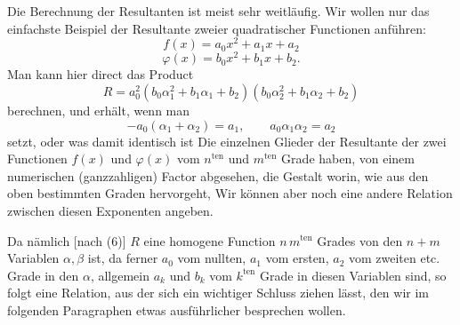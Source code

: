 
Die Berechnung der Resultanten ist meist sehr weitläufig. Wir wollen nur das einfachste Beispiel der Resultante zweier quadratischer Functionen anführen:
\[
f(x) = a_0 x^2 + a_1 x + a_2
\]
\[
\varphi(x) = b_0 x^2 + b_1 x + b_2.
\]
Man kann hier direct das Product
\[
R = a_0^2 (b_0 \alpha_1^2 + b_1 \alpha_1 + b_2) (b_0 \alpha_2^2 + b_1 \alpha_2 + b_2)
\]
berechnen, und erhält, wenn man
\[
- a_0 (\alpha_1 + \alpha_2) = a_1, \qquad a_0 \alpha_1 \alpha_2 = a_2
\]
setzt,
oder was damit identisch ist
Die einzelnen Glieder der Resultante der zwei Functionen $f(x)$ und $\varphi(x)$ vom $n^{\mathrm{ten}}$ und $m^{\mathrm{ten}}$ Grade haben, von einem numerischen (ganzzahligen) Factor abgesehen, die Gestalt
worin, wie aus den oben bestimmten Graden hervorgeht,
Wir können aber noch eine andere Relation zwischen diesen Exponenten angeben.

Da nämlich [nach (6)] $R$ eine homogene Function $n\,m^{\mathrm{ten}}$ Grades von den $n+m$ Variablen $\alpha, \beta$ ist, da ferner $a_0$ vom nullten, $a_1$ vom ersten, $a_2$ vom zweiten etc. Grade in den $\alpha$, allgemein $a_k$ und $b_k$ vom $k^{\mathrm{ten}}$ Grade in diesen Variablen sind, so folgt
eine Relation, aus der sich ein wichtiger Schluss ziehen lässt, den wir im folgenden Paragraphen etwas ausführlicher besprechen wollen.
